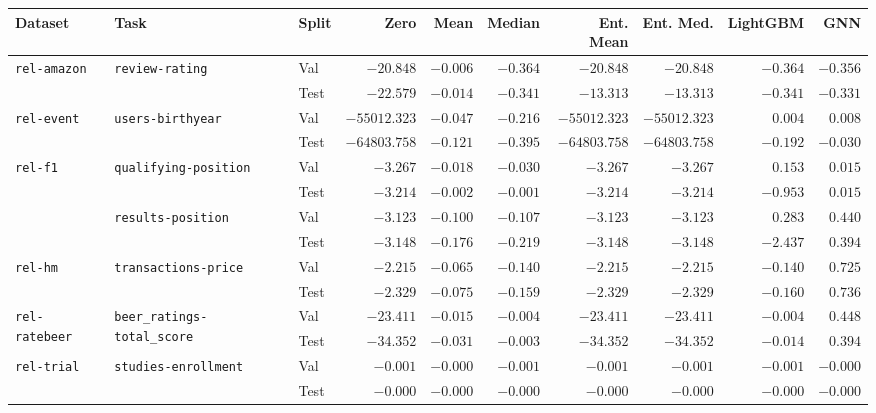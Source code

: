 \begin{tabular}{lllrrrrrrr}
\toprule
Dataset & Task & Split & Zero & Mean & Median & Ent. Mean & Ent. Med. & LightGBM & GNN \\
\midrule
\multirow[c]{2}{*}{\texttt{rel-amazon}} & \multirow[c]{2}{*}{\texttt{review-rating}} & Val & $-20.848$ & $\bm{-0.006}$ & $-0.364$ & $-20.848$ & $-20.848$ & $-0.364$ & $-0.356$ \\
 &  & Test & $-22.579$ & $\bm{-0.014}$ & $-0.341$ & $-13.313$ & $-13.313$ & $-0.341$ & $-0.331$ \\
\cmidrule{1-10} \cmidrule{2-10}
\multirow[c]{2}{*}{\texttt{rel-event}} & \multirow[c]{2}{*}{\texttt{users-birthyear}} & Val & $-55012.323$ & $-0.047$ & $-0.216$ & $-55012.323$ & $-55012.323$ & $0.004$ & $\bm{0.008}$ \\
 &  & Test & $-64803.758$ & $-0.121$ & $-0.395$ & $-64803.758$ & $-64803.758$ & $-0.192$ & $\bm{-0.030}$ \\
\cmidrule{1-10} \cmidrule{2-10}
\multirow[c]{4}{*}{\texttt{rel-f1}} & \multirow[c]{2}{*}{\texttt{qualifying-position}} & Val & $-3.267$ & $-0.018$ & $-0.030$ & $-3.267$ & $-3.267$ & $\bm{0.153}$ & $0.015$ \\
 &  & Test & $-3.214$ & $-0.002$ & $-0.001$ & $-3.214$ & $-3.214$ & $-0.953$ & $\bm{0.015}$ \\
\cmidrule{2-10}
 & \multirow[c]{2}{*}{\texttt{results-position}} & Val & $-3.123$ & $-0.100$ & $-0.107$ & $-3.123$ & $-3.123$ & $0.283$ & $\bm{0.440}$ \\
 &  & Test & $-3.148$ & $-0.176$ & $-0.219$ & $-3.148$ & $-3.148$ & $-2.437$ & $\bm{0.394}$ \\
\cmidrule{1-10} \cmidrule{2-10}
\multirow[c]{2}{*}{\texttt{rel-hm}} & \multirow[c]{2}{*}{\texttt{transactions-price}} & Val & $-2.215$ & $-0.065$ & $-0.140$ & $-2.215$ & $-2.215$ & $-0.140$ & $\bm{0.725}$ \\
 &  & Test & $-2.329$ & $-0.075$ & $-0.159$ & $-2.329$ & $-2.329$ & $-0.160$ & $\bm{0.736}$ \\
\cmidrule{1-10} \cmidrule{2-10}
\multirow[c]{2}{*}{\texttt{rel-ratebeer}} & \multirow[c]{2}{*}{\texttt{beer\_ratings-total\_score}} & Val & $-23.411$ & $-0.015$ & $-0.004$ & $-23.411$ & $-23.411$ & $-0.004$ & $\bm{0.448}$ \\
 &  & Test & $-34.352$ & $-0.031$ & $-0.003$ & $-34.352$ & $-34.352$ & $-0.014$ & $\bm{0.394}$ \\
\cmidrule{1-10} \cmidrule{2-10}
\multirow[c]{2}{*}{\texttt{rel-trial}} & \multirow[c]{2}{*}{\texttt{studies-enrollment}} & Val & $-0.001$ & $\bm{-0.000}$ & $-0.001$ & $-0.001$ & $-0.001$ & $-0.001$ & $-0.000$ \\
 &  & Test & $-0.000$ & $\bm{-0.000}$ & $-0.000$ & $-0.000$ & $-0.000$ & $-0.000$ & $-0.000$ \\
\bottomrule
\end{tabular}
